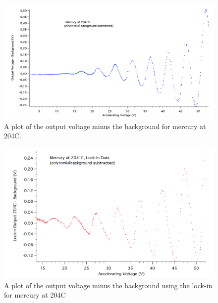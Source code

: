 \documentclass[prb,preprint]{revtex4-1}
\begin{document}
\begin{figure}[h!] %
\centering
\includegraphics[width=6in]{204C_noback.png}
\caption{A plot of the output voltage minus the background for mercury at 204\degree C.}
\label{nobacknolock}
\end{figure}

\begin{figure}[h!]
\centering
\includegraphics[width=6in]{204C_lockin_noback.png}
\caption{A plot of the output voltage minus the background using the lock-in for mercury at 204\degree C}
\label{nobacklock}
\end{figure}
\end{document}
